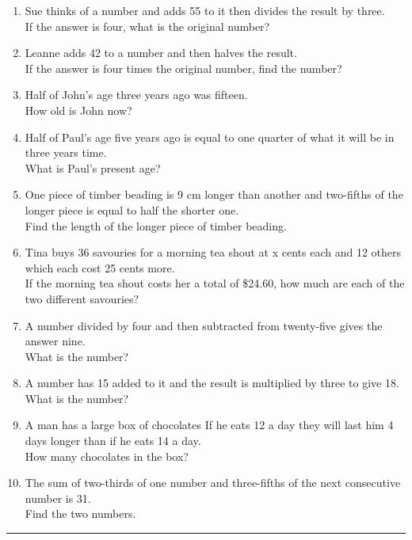 \documentclass[a4paper,12pt]{article}
\newcommand\questionend{
	\rule[0pt]{17cm}{0.5pt}\vspace{0.0cm}\\
}
\begin{document}
\begin{enumerate}[label=\normalsize \alph*)~~~]
\item Sue thinks of a number and adds 55 to it then divides the result by three.\\
 If the answer is four, what is the original number?
\item Leanne adds 42 to a number and then halves the result.\\
 If the answer is four times the original number, find the number?
\item Half of John’s age three years ago was fifteen.\\
 How old is John now?
\item Half of Paul’s age five years ago is equal to one quarter of what it will be in three years time.\\
 What is Paul’s present age?
\item One piece of timber beading is 9 cm longer than another and two-fifths of the longer piece is equal to half the shorter one.\\
 Find the length of the longer piece of timber beading.
\item Tina buys 36 savouries for a morning tea shout at x cents each and 12 others which each cost 25 cents more. \\
If the morning tea shout costs her a total of \$24.60, how much are each of the two different savouries?
\item A number divided by four and then subtracted from twenty-five gives the answer nine.\\
 What is the number?
\item A number has 15 added to it and the result is multiplied by three to give 18. \\
What is the number?
\item A man has a large box of chocolates If he eats 12 a day they will last him 4 days longer than if he eats 14 a day. \\
How many chocolates in the box?
\item The sum of two-thirds of one number and three-fifths of the next consecutive number is 31. \\
Find the two numbers.
\end{enumerate}
\questionend

\newpage
\end{document}
